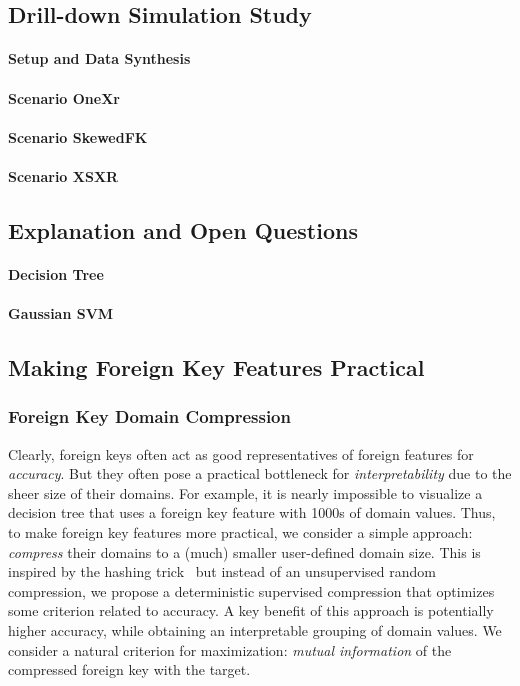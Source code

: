 \documentclass[sigconf]{acmart}
\begin{document}
\subsection{Drill-down Simulation Study}

\paragraph*{Setup and Data Synthesis}

\paragraph*{Scenario OneXr}

\paragraph*{Scenario SkewedFK}


\paragraph*{Scenario XSXR}


\subsection{Explanation and Open Questions}

\paragraph*{Decision Tree}

\paragraph*{Gaussian SVM}


\subsection{Making Foreign Key Features Practical}

\subsubsection{Foreign Key Domain Compression}

Clearly, foreign keys often act as good representatives of foreign features for \textit{accuracy}.
But they often pose a practical bottleneck for \textit{interpretability} due to the sheer size of their domains.
For example, it is nearly impossible to visualize a decision tree that uses a foreign key feature with 1000s of domain values.
Thus, to make foreign key features more practical, we consider a simple approach: \textit{compress} their domains to a (much) smaller 
user-defined domain size. This is inspired by the hashing trick~\cite{hashingtrick} but instead of an unsupervised random 
compression, we propose a deterministic supervised compression that optimizes some criterion related to accuracy. A key benefit of 
this approach is potentially higher accuracy, while obtaining an interpretable grouping of domain values.
We consider a natural criterion for maximization: \textit{mutual information} of the compressed foreign key with the target.
\end{document}
